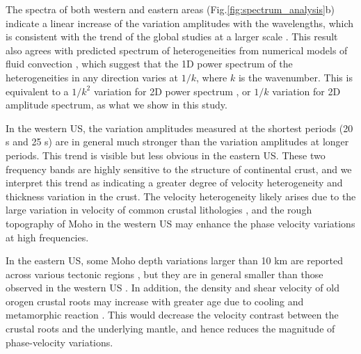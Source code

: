 The spectra of both western and eastern areas (Fig.\ref{fig:spectrum_analysis}b) indicate a linear increase of the variation amplitudes with the wavelengths, which is consistent with the trend of the global studies at a larger scale \citep{Chevrot:1998hm,Dziewonski:2010gj}. This result also agrees with predicted spectrum of heterogeneities from numerical models of fluid convection \citep[e.g.,][]{Batchelor:1959cb,AntonsenJr:1991tc,Ricard:2014dv}, which suggest that the 1D power spectrum of the heterogeneities in any direction varies at $1/k$, where $k$ is the wavenumber. This is equivalent to a $1/k^2$ variation for 2D power spectrum \citep{Chevrot:1998hm}, or $1/k$ variation for 2D amplitude spectrum, as what we show in this study.



In the western US, the variation amplitudes measured at the shortest periods (20 s and 25 s) are in general much stronger than the variation amplitudes at longer periods. This trend is visible but less obvious in the eastern US. 
These two frequency bands are highly sensitive to the structure of continental crust, and we interpret this trend as indicating a greater degree of velocity heterogeneity and thickness variation in the crust.  The velocity heterogeneity likely arises due to the large variation in velocity of common crustal lithologies \citep[e.g.,][]{Christensen:1995cw}, and the rough topography of Moho in the western US \citep{Shen:2013bi} may enhance the phase velocity variations at high frequencies. 

In the eastern US, some Moho depth variations larger than 10 km are reported across various tectonic regions \citep[e.g.,][]{Li:2002el,Shen:2013dd,Parker:2013ku}, but they are in general smaller than those observed in the western US \citep[e.g.,][]{Crotwell:2005iu,Shen:2013bi,Levandowski:2014ey}. In addition, the density and shear velocity of old orogen crustal roots may increase with greater age due to cooling and metamorphic reaction \citep{Fischer:2002uj}. This would decrease the velocity contrast between the crustal roots and the underlying mantle, and hence reduces the magnitude of phase-velocity variations. 

